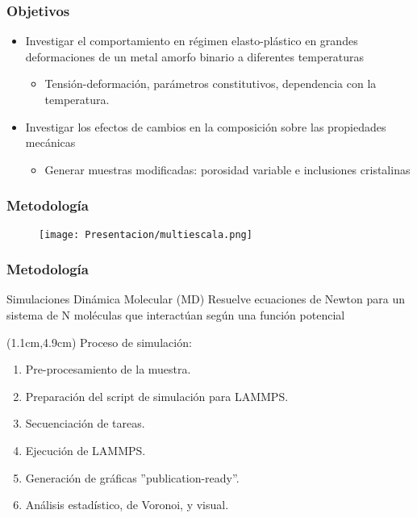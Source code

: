 \begin{frame}
 \frametitle{Objetivos}
 \vspace{0.5cm}
\begin{itemize}
 \item Investigar el comportamiento en r\'egimen elasto-pl\'astico en grandes deformaciones de un metal amorfo binario a diferentes temperaturas
 \begin{itemize}
  \item Tensión-deformación, parámetros constitutivos, dependencia con la temperatura.
 \end{itemize}
 \item Investigar los efectos de cambios en la composici\'on sobre las propiedades mec\'anicas
 \begin{itemize}
  \item Generar muestras modificadas: porosidad variable e inclusiones cristalinas
 \end{itemize}
\end{itemize}
\end{frame}

\begin{frame}
 \frametitle{Metodología}
 \begin{figure}
  \centering
  \texttt{[image: Presentacion/multiescala.png]}
 \end{figure}

\end{frame}

\begin{frame}
 \frametitle{Metodología}
 \begin{block}{Simulaciones Din\'amica Molecular (MD)}
  Resuelve ecuaciones de Newton para un sistema de N mol\'eculas que interact\'uan seg\'un una funci\'on potencial
 \end{block}
 \begin{textblock*}{12cm}(1.1cm,4.9cm)
  Proceso de simulación:
  \begin{enumerate}
   \item Pre-procesamiento de la muestra.
   \item Preparación del script de simulación para LAMMPS.
   \item Secuenciación de tareas.
   \item Ejecución de LAMMPS.
   \item Generación de gráficas ''publication-ready''.
   \item Análisis estadístico, de Voronoi, y visual.
  \end{enumerate}
 \end{textblock*}
\end{frame}
